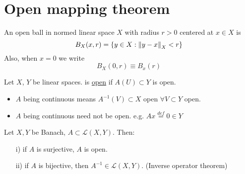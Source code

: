 \begin{comment}
\end{corollary}

\begin{example}[???]\nl
	A is surjective: for $g\in C$ define $f(t)=\int_0^t g(s) ds$. Then by FTC, $Af=g$.\\
	A is not injective: $Af=A\tilde{f}\implies f=\tilde{f}+c,c\in\real$. 
	Let $D(A)\defeq C_0^1[0,1]=\{f\in C^1[0,1]:f(0)=0\}$
	Then $A:D(A)\to C$ is bijective and has continuous inverse $B=A^{-1}$ by corollary. In fact, $Bf(t)=\int_0^tf(s)ds$ with $Bf\in D(A)$.
\end{example}

\end{comment}


\section{Open mapping theorem}
\begin{definition}\nl
An open ball in normed linear space $X$ with radius $r>0$ centered at $x\in X$ is
$$
B_X(x,r)=\{y\in X:\left\|{y-x}\right\|_X<r\}
$$
Also, when $x=0$ we write 
$$
B_X(0,r)\equiv B_x(r)
$$
\end{definition}

\begin{definition}\label{open map}\nl
	Let $X$, $Y$ be linear spaces.  is {\underline{open}} if $A(U)\subset Y $ is open.
\end{definition}
\begin{remark}\hfill

\begin{itemize}
    \item $A$ being continuous means $A^{-1}(V)\subset{X}$ open $\forall V\subset Y$ open.
    \item $A$ being continuous need not be open. e.g. $Ax\stackrel{def}{=}0\in Y$
\end{itemize}
\end{remark}

\begin{theorem}\label{OMT}\nl
	Let $X,Y$ be Banach, $A\subset\mathcal{L}(X,Y)$. Then:
	\begin{itemize}
	    \item[i)] if $A$ is surjective, $A$ is open.
	    \item[ii)] if $A$ is bijective, then $A^{-1}\in \mathcal{L}(X,Y)$. (Inverse operator theorem)
	\end{itemize}
\end{theorem}

